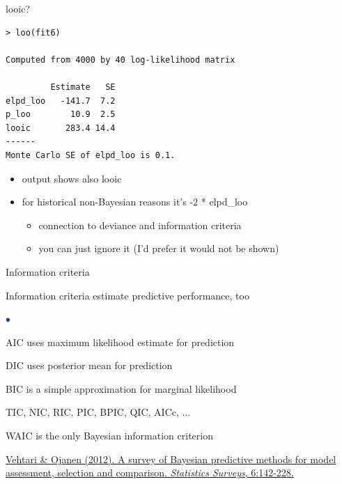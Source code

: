 \documentclass[english,t]{beamer}
\newenvironment{list1}{
   \begin{list}{$\color{list1}\bullet$}{\itemsep=6pt}}{
  \end{list}}
\begin{document}
\begin{frame}[fragile]{looic?}

\begin{verbatim}
> loo(fit6)

Computed from 4000 by 40 log-likelihood matrix

         Estimate   SE
elpd_loo   -141.7  7.2
p_loo        10.9  2.5
looic       283.4 14.4
------
Monte Carlo SE of elpd_loo is 0.1.
\end{verbatim}

  \begin{itemize}
  \item {} output shows also {looic}
  \item for historical non-Bayesian reasons it's -2 * elpd\_loo
    \begin{itemize}
      \item connection to deviance and information criteria
      \item you can just ignore it (I'd prefer it would not be shown)
    \end{itemize}

  \end{itemize}
  
\end{frame}

\begin{frame}{Information criteria}

  Information criteria estimate predictive performance, too
  
\begin{list1}
  \item<+-> AIC uses maximum likelihood estimate for prediction
  \item<+-> DIC uses posterior mean for prediction
  \item<+-> BIC is a simple approximation for marginal likelihood
  \item<+-> TIC, NIC, RIC, PIC, BPIC, QIC, AICc, ...
  \item<+-> WAIC is the only Bayesian information criterion
\end{list1}

\vspace{5\baselineskip}
{\color{gray}\footnotesize\href{http://dx.doi.org/10.1214/12-SS102}{Vehtari \& Ojanen (2012). A survey of Bayesian predictive methods for model assessment, selection and comparison. \textit{Statistics Surveys}, 6:142-228.}}
\end{frame}
\end{document}
